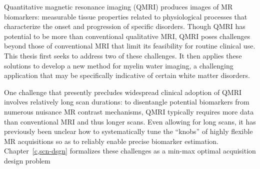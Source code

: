 \setlength{\parindent}{0ex}
Quantitative magnetic resonance imaging (QMRI)
produces images of  MR biomarkers: 
measurable tissue properties
related to physiological processes
that characterize the onset and progression
of specific disorders.
Though QMRI has potential 
to be more  
than conventional qualitative MRI,
QMRI poses challenges 
beyond those of conventional MRI
that limit its feasibility 
for routine clinical use.
This thesis first seeks to address 
two of these challenges.
It then applies these solutions
to develop a new method
for myelin water imaging,
a challenging application 
that may be specifically indicative
of certain white matter disorders. 

\setlength{\parindent}{4ex}
One challenge 
that presently precludes widespread clinical adoption of QMRI
involves relatively long scan durations:
to disentangle potential biomarkers
from numerous nuisance MR contrast mechanisms,
QMRI typically requires more data than conventional MRI
and thus longer scans. 
Even allowing for long scans,
it has previously been unclear 
how to systematically tune the ``knobs'' 
of highly flexible MR acquisitions
so as to reliably enable precise biomarker estimation.
Chapter~\ref{c,scn-dsgn} formalizes these challenges
as a min-max optimal acquisition design problem
%

